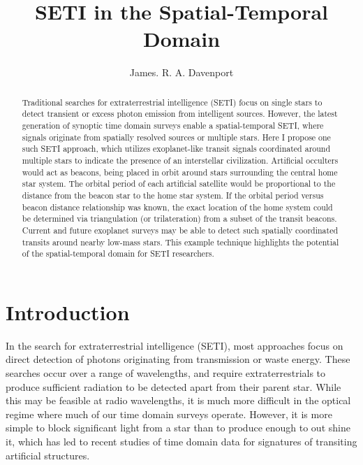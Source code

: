\documentclass[modern]{aastex61}
\begin{document}
\title{SETI in the Spatial-Temporal Domain}



\author{James. R. A. Davenport}


\begin{abstract}
Traditional searches for extraterrestrial intelligence (SETI) focus on single stars to detect transient or excess photon emission from intelligent sources. However, the latest generation of synoptic time domain surveys enable a spatial-temporal SETI, where signals originate from spatially resolved sources or multiple stars. Here I propose one such SETI approach, which utilizes exoplanet-like transit signals coordinated around multiple stars to indicate the presence of an interstellar civilization. Artificial occulters would act as beacons, being placed in orbit around stars surrounding the central home star system. The orbital period of each artificial satellite would be proportional to the distance from the beacon star to the home star system. If the orbital period versus beacon distance relationship was known, the exact location of the home system could be determined via triangulation (or trilateration) from a subset of the transit beacons. Current and future exoplanet surveys may be able to detect such spatially coordinated transits around nearby low-mass stars.  This example technique highlights the potential of the spatial-temporal domain for SETI researchers.
\end{abstract}



\section{Introduction}

In the search for extraterrestrial intelligence (SETI), most approaches focus on direct detection of photons originating from transmission or waste energy. These searches occur over a range of wavelengths, and require extraterrestrials to produce sufficient radiation to be detected apart from their parent star. While this may be feasible at radio wavelengths, it is much more difficult in the optical regime where much of our time domain surveys operate. However,  it is more simple to block significant light from a star than to produce enough to out shine it, which has led to recent studies of time domain data for signatures of transiting artificial structures. 
\end{document}
